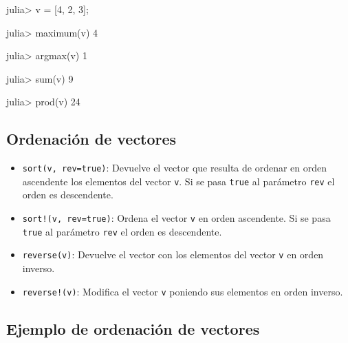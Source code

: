 \documentclass[
  letterpaper,
  DIV=11,
  numbers=noendperiod]{scrreprt}
\newenvironment{Shaded}{\begin{snugshade}}{\end{snugshade}}
\newcommand{\FloatTok}[1]{\textcolor[rgb]{0.68,0.00,0.00}{#1}}
\newcommand{\FunctionTok}[1]{\textcolor[rgb]{0.28,0.35,0.67}{#1}}
\newcommand{\NormalTok}[1]{\textcolor[rgb]{0.00,0.23,0.31}{#1}}
\newcommand{\OperatorTok}[1]{\textcolor[rgb]{0.37,0.37,0.37}{#1}}
\providecommand{\tightlist}{%
  \setlength{\itemsep}{0pt}\setlength{\parskip}{0pt}}\usepackage{longtable,booktabs,array}
\begin{document}
\begin{Shaded}
\begin{Highlighting}[]
\NormalTok{julia}\OperatorTok{\textgreater{}}\NormalTok{ v }\OperatorTok{=}\NormalTok{ [}\FloatTok{4}\NormalTok{, }\FloatTok{2}\NormalTok{, }\FloatTok{3}\NormalTok{];}

\NormalTok{julia}\OperatorTok{\textgreater{}} \FunctionTok{maximum}\NormalTok{(v)}
\FloatTok{4}

\NormalTok{julia}\OperatorTok{\textgreater{}} \FunctionTok{argmax}\NormalTok{(v)}
\FloatTok{1}

\NormalTok{julia}\OperatorTok{\textgreater{}} \FunctionTok{sum}\NormalTok{(v)}
\FloatTok{9}

\NormalTok{julia}\OperatorTok{\textgreater{}} \FunctionTok{prod}\NormalTok{(v)}
\FloatTok{24}
\end{Highlighting}
\end{Shaded}

\hypertarget{ordenaciuxf3n-de-vectores}{%
\subsection{Ordenación de vectores}\label{ordenaciuxf3n-de-vectores}}

\begin{itemize}
\tightlist
\item
  \texttt{sort(v,\ rev=true)}: Devuelve el vector que resulta de ordenar
  en orden ascendente los elementos del vector \texttt{v}. Si se pasa
  \texttt{true} al parámetro \texttt{rev} el orden es descendente.
\item
  \texttt{sort!(v,\ rev=true)}: Ordena el vector \texttt{v} en orden
  ascendente. Si se pasa \texttt{true} al parámetro \texttt{rev} el
  orden es descendente.
\item
  \texttt{reverse(v)}: Devuelve el vector con los elementos del vector
  \texttt{v} en orden inverso.
\item
  \texttt{reverse!(v)}: Modifica el vector \texttt{v} poniendo sus
  elementos en orden inverso.
\end{itemize}

\hypertarget{ejemplo-de-ordenaciuxf3n-de-vectores}{%
\subsection{Ejemplo de ordenación de
vectores}\label{ejemplo-de-ordenaciuxf3n-de-vectores}}
\end{document}
